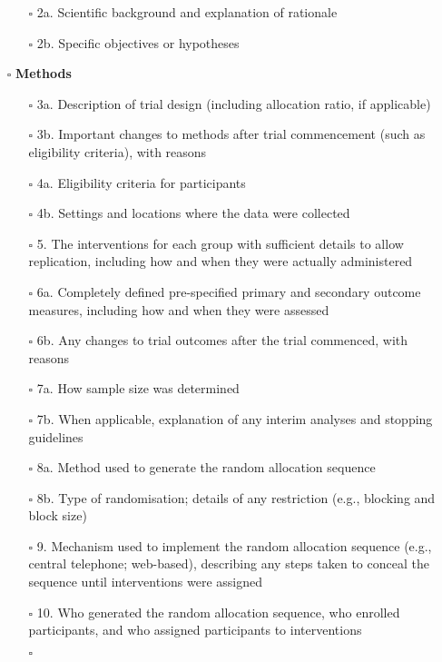 \documentclass[11pt]{article}
\def\tightlist{}
\begin{document}
\begin{Form}
\begin{itemize}
  \begin{itemize}
  \tightlist
  \item[$\square$]
    2a. Scientific background and explanation of rationale
  \item[$\square$]
    2b. Specific objectives or hypotheses
  \end{itemize}
\item[$\square$]
  \textbf{Methods}

  \begin{itemize}
  \tightlist
  \item[$\square$]
    3a. Description of trial design (including allocation ratio, if
    applicable)
  \item[$\square$]
    3b. Important changes to methods after trial commencement (such as
    eligibility criteria), with reasons
  \item[$\square$]
    4a. Eligibility criteria for participants
  \item[$\square$]
    4b. Settings and locations where the data were collected
  \item[$\square$]
    5. The interventions for each group with sufficient details to allow
    replication, including how and when they were actually administered
  \item[$\square$]
    6a. Completely defined pre-specified primary and secondary outcome
    measures, including how and when they were assessed
  \item[$\square$]
    6b. Any changes to trial outcomes after the trial commenced, with
    reasons
  \item[$\square$]
    7a. How sample size was determined
  \item[$\square$]
    7b. When applicable, explanation of any interim analyses and
    stopping guidelines
  \item[$\square$]
    8a. Method used to generate the random allocation sequence
  \item[$\square$]
    8b. Type of randomisation; details of any restriction (e.g.,
    blocking and block size)
  \item[$\square$]
    9. Mechanism used to implement the random allocation sequence (e.g.,
    central telephone; web-based), describing any steps taken to conceal
    the sequence until interventions were assigned
  \item[$\square$]
    10. Who generated the random allocation sequence, who enrolled
    participants, and who assigned participants to interventions
  \item[$\square$]

\end{itemize}
\end{itemize}
\end{Form}
\end{document}
